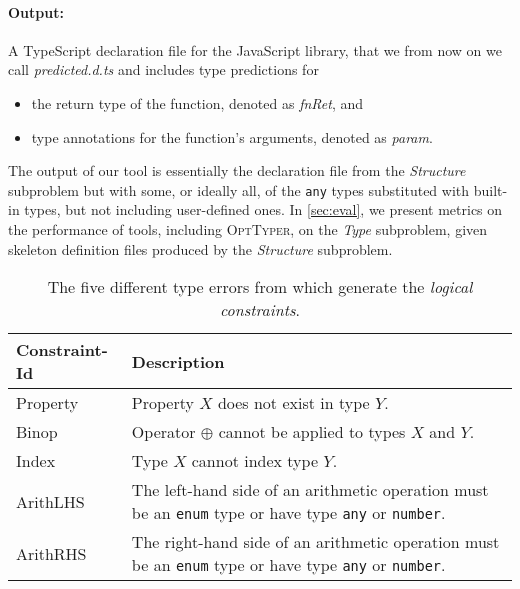 \documentclass[sigplan,10pt,review,anonymous]{acmart} %
\newcommand{\projectname}{\textsc{OptTyper}\xspace}
\theoremstyle{plain}
\theoremstyle{remark}
\theoremstyle{definition}
\begin{document}
\paragraph{Output:} A TypeScript declaration file for the
JavaScript library, that we from now on we call \textit{predicted.d.ts} and
includes type predictions for
\begin{itemize}[label=\raisebox{0.25ex}{\tiny$\bullet$}]
	\item the return type of the function, denoted as \emph{fnRet}, and
	\item type annotations for the function's arguments, denoted as \emph{param}.
\end{itemize}
%
The output of our tool is essentially the declaration file from the \textit{Structure} subproblem
but with some, or ideally all, of the \texttt{any} types substituted with built-in types, but not including user-defined ones.
%
In \cref{sec:eval}, we present metrics on the performance of tools, including \projectname, on the \textit{Type} subproblem,
given skeleton definition files produced by the \textit{Structure} subproblem. 

\begin{table*}[t]
	\centering
	\caption{The five different type errors from which generate the \textit{logical constraints}.}
	\label{tab:constraints}
	\begin{tabularx}{\textwidth}{lX}
		\toprule
		Constraint-Id & Description                                                                                  \\
		\midrule
		Property      & Property $X$ does not exist in type $Y$.                                                     \\
		Binop         & Operator $\oplus$ cannot be applied
		to types $X$ and $Y$.                                                                                        \\
		Index         & Type $X$ cannot index type $Y$.                                                              \\
		ArithLHS      & The left-hand side of an arithmetic operation must be
		an \lstinline+enum+ type or have type \lstinline+any+ or \lstinline+number+.    \\
		ArithRHS      & The right-hand side of an arithmetic operation must be
		an \lstinline+enum+ type or have type \lstinline+any+ or \lstinline+number+. \\
		\bottomrule
	\end{tabularx}
\end{table*}
\end{document}
